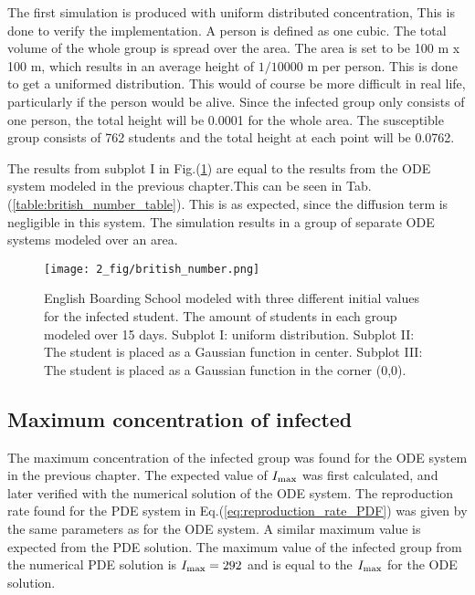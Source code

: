 \documentclass[%
twoside,                 %
final,                   %
chapterprefix=true,      %
open=right               %
10pt]{book}
\begin{document}
\vspace{3mm}




\vspace{3mm}


The first simulation is produced with uniform distributed concentration, This is done to verify the implementation. A person is defined as one cubic. The total volume of the whole group is spread over the area. The area is set to be 100 m x 100 m, which results in an average height of $1/10000$ m per person. This is done to get a uniformed distribution. This would of course be more difficult in real life, particularly if the person would be alive. Since the infected group only consists of one person, the total height will be 0.0001 for the whole area. The susceptible group consists of 762 students and the total height at each point will be 0.0762. 


\vspace{3mm}




\vspace{3mm}


The results from subplot I in Fig.(\ref{fig:british_number}) are equal to the results from the ODE system modeled in the previous chapter.This can be seen in Tab.(\ref{table:british_number_table}). This is as expected, since the diffusion term is negligible in this system. The simulation results in a group of separate ODE systems modeled over an area.


\begin{figure}[ht]
  \centerline{\texttt{[image: 2\_fig/british\_number.png]}}
  \caption{
  \label{fig:british_number} English Boarding School modeled with three different initial values for the infected student. The amount of students in each group modeled over 15 days. Subplot I: uniform distribution. Subplot II: The student is placed as a Gaussian function in center. Subplot III: The student is placed as a Gaussian function in the corner (0,0).
  }
\end{figure}


\subsection{Maximum concentration of infected}
The maximum concentration of the infected group was found for the ODE system in the previous chapter. The expected value of $I_{\textrm{max}}$ was first calculated, and later verified with the numerical solution of the ODE system. The reproduction rate found for the PDE system in Eq.(\ref{eq:reproduction_rate_PDF}) was given by the same parameters as for the ODE system. A similar maximum value is expected from the PDE solution. The maximum value of the infected group from the numerical PDE solution is $I_{\textrm{max}}=292$ and is equal to the $I_{\textrm{max}}$ for the ODE solution. 
\end{document}
